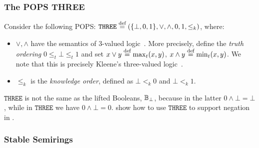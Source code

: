\subsubsection{The POPS THREE} \label{subsec:three:pops}

Consider the following POPS:
$\texttt{THREE} \stackrel{\text{def}}{=} (\{\bot, 0,  1\}, \vee, \wedge,  0,
 1, \leq_k)$, where:
\begin{itemize}
\item $\vee, \wedge$ have the semantics of 3-valued
  logic~\cite{DBLP:journals/jlp/Fitting85a}.  More precisely, define
  the {\em truth ordering} $0 \leq_t \bot \leq_t 1$ and set
  $x \vee y \stackrel{\text{def}}{=} \max_t(x,y)$, $x \wedge y \stackrel{\text{def}}{=} \min_t(x,y)$.  We
  note that this is precisely Kleene's three-valued
  logic~\cite{DBLP:journals/logcom/Fitting91}.
\item $\leq_k$ is the {\em knowledge order\/}, defined as
  $\bot <_k  0$ and $\bot <_k  1$.
\end{itemize}
%
$\texttt{THREE}$ is not the same as the lifted Booleans, $\mathbb B_\bot$,
because in the latter $0 \wedge \bot = \bot$, while in
$\texttt{THREE}$ we have $0 \wedge \bot = 0$.  
\cite{DBLP:conf/pods/Khamis0PSW22} show how to use $\texttt{THREE}$ to support 
 negation in \datalogo.

\subsubsection{Stable Semirings}
\label{subsec:stable:semirings}

